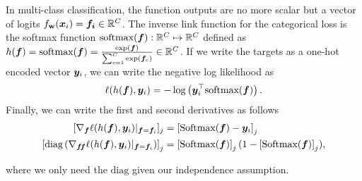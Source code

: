 \documentclass{article} %
\makeatletter
\newcommand{\ie}{\textit{i.e.\@}\xspace}
\newcommand{\weights}{\ensuremath{\mathbf{w}}}
\newcommand{\T}{\top}
\makeatother
\begin{document}
In multi-class classification, the function outputs are no more scalar but a vector of logits $f_\weights(\vx_i) = \bm{f _i} \in \R^C$. The inverse link function for the categorical loss is the softmax function $\textrm{softmax}(\bm{f}) : \mathbb{R}^C \mapsto \mathbb{R}^C$ defined as $h(\bm{f}) = \textrm{softmax}(\bm{f}) = \frac{\exp(\bm{f})}{ \sum^C_{c=1} \exp(\bm{f}_c)} \in \mathbb{R}^C$. If we write the targets as a one-hot  encoded vector ${\bm{y}}_i$, we can write the negative log likelihood as
\begin{equation}
\begin{aligned}
	\ell(h(\bm{f}),\vy_i) &= - \log\left( \vy_i^\T \textrm{softmax}(\bm{f})\right).\\
\end{aligned}
\end{equation}
Finally, we can write the first and second derivatives as follows
\begin{equation}
\begin{aligned}
	[\nabla_{\bm{f}} \ell(h(\bm{f}), \vy_i)|_{\bm{f}=\bm{f}_i}]_j &= \left[\textrm{Softmax}(\bm{f}) - \vy_i  \right]_j \\
	\left[\textrm{diag}\left(\nabla_{\bm{f}\!\bm{f}} \ell(h(\bm{f}), \vy_i)|_{\bm{f}=\bm{f}_i}\right)\right]_{j} &= \left[\textrm{Softmax}(\bm{f})\right]_j (1 - \left[\textrm{Softmax}(\bm{f})\right]_j),
\end{aligned}
\end{equation}

where we only need the $\textrm{diag}$ given our independence assumption.

\end{document}
